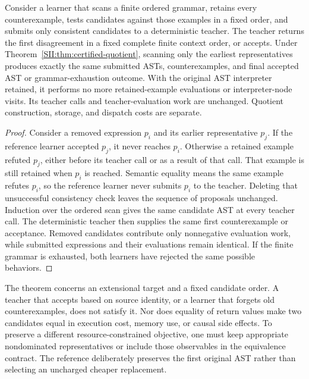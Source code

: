 \begin{SIItheorem}\label{SII:thm:cegis-quotient}
Consider a learner that scans a finite ordered grammar, retains every counterexample, tests candidates against those examples in a fixed order, and submits only consistent candidates to a deterministic teacher. The teacher returns the first disagreement in a fixed complete finite context order, or accepts. Under Theorem~\ref{SII:thm:certified-quotient}, scanning only the earliest representatives produces exactly the same submitted ASTs, counterexamples, and final accepted AST or grammar-exhaustion outcome. With the original AST interpreter retained, it performs no more retained-example evaluations or interpreter-node visits. Its teacher calls and teacher-evaluation work are unchanged. Quotient construction, storage, and dispatch costs are separate.
\end{SIItheorem}
\begin{proof}
Consider a removed expression $p_i$ and its earlier representative $p_j$. If the reference learner accepted $p_j$, it never reaches $p_i$. Otherwise a retained example refuted $p_j$, either before its teacher call or as a result of that call. That example is still retained when $p_i$ is reached. Semantic equality means the same example refutes $p_i$, so the reference learner never submits $p_i$ to the teacher. Deleting that unsuccessful consistency check leaves the sequence of proposals unchanged. Induction over the ordered scan gives the same candidate AST at every teacher call. The deterministic teacher then supplies the same first counterexample or acceptance. Removed candidates contribute only nonnegative evaluation work, while submitted expressions and their evaluations remain identical. If the finite grammar is exhausted, both learners have rejected the same possible behaviors.
\end{proof}

The theorem concerns an extensional target and a fixed candidate order. A teacher that accepts based on source identity, or a learner that forgets old counterexamples, does not satisfy it. Nor does equality of return values make two candidates equal in execution cost, memory use, or causal side effects. To preserve a different resource-constrained objective, one must keep appropriate nondominated representatives or include those observables in the equivalence contract. The reference deliberately preserves the first original AST rather than selecting an uncharged cheaper replacement.

